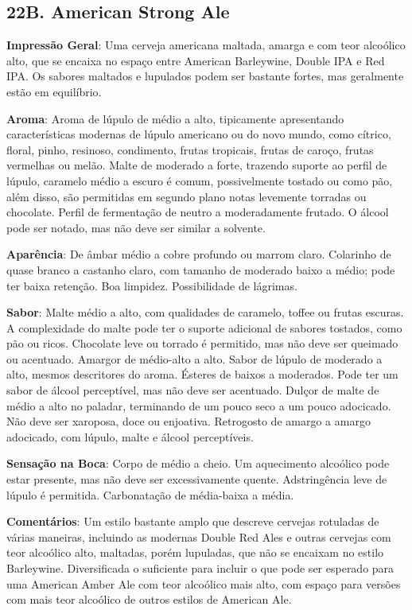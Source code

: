 \subsection*{22B. American Strong Ale}
\textbf{Impressão Geral}: Uma cerveja americana maltada, amarga e com teor alcoólico alto, que se encaixa no espaço entre American Barleywine, Double IPA e Red IPA. Os sabores maltados e lupulados podem ser bastante fortes, mas geralmente estão em equilíbrio.

\textbf{Aroma}: Aroma de lúpulo de médio a alto, tipicamente apresentando características modernas de lúpulo americano ou do novo mundo, como cítrico, floral, pinho, resinoso, condimento, frutas tropicais, frutas de caroço, frutas vermelhas ou melão. Malte de moderado a forte, trazendo suporte ao perfil de lúpulo, caramelo médio a escuro é comum, possivelmente tostado ou como pão, além disso, são permitidas em segundo plano notas levemente torradas ou chocolate. Perfil de fermentação de neutro a moderadamente frutado. O álcool pode ser notado, mas não deve ser similar a solvente.

\textbf{Aparência}: De âmbar médio a cobre profundo ou marrom claro. Colarinho de quase branco a castanho claro, com tamanho de moderado baixo a médio; pode ter baixa retenção. Boa limpidez. Possibilidade de lágrimas.

\textbf{Sabor}: Malte médio a alto, com qualidades de caramelo, toffee ou frutas escuras. A complexidade do malte pode ter o suporte adicional de sabores tostados, como pão ou ricos. Chocolate leve ou torrado é permitido, mas não deve ser queimado ou acentuado. Amargor de médio-alto a alto. Sabor de lúpulo de moderado a alto, mesmos descritores do aroma. Ésteres de baixos a moderados. Pode ter um sabor de álcool perceptível, mas não deve ser acentuado. Dulçor de malte de médio a alto no paladar, terminando de um pouco seco a um pouco adocicado. Não deve ser xaroposa, doce ou enjoativa. Retrogosto de amargo a amargo adocicado, com lúpulo, malte e álcool perceptíveis.

\textbf{Sensação na Boca}: Corpo de médio a cheio. Um aquecimento alcoólico pode estar presente, mas não deve ser excessivamente quente. Adstringência leve de lúpulo é permitida. Carbonatação de média-baixa a média.

\textbf{Comentários}: Um estilo bastante amplo que descreve cervejas rotuladas de várias maneiras, incluindo as modernas Double Red Ales e outras cervejas com teor alcoólico alto, maltadas, porém lupuladas, que não se encaixam no estilo Barleywine. Diversificada o suficiente para incluir o que pode ser esperado para uma American Amber Ale com teor alcoólico mais alto, com espaço para versões com mais teor alcoólico de outros estilos de American Ale.

